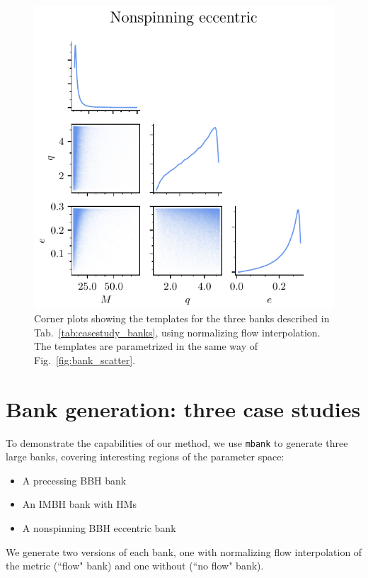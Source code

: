 \documentclass[twocolumn,showpacs,preprintnumbers,nofootinbib,prd,
superscriptaddress,10pt]{revtex4-2}
\begin{document}
\begin{figure}[t]
	\includegraphics[scale = 0.7]{bank_scatter_Nonspinning_eccentric_flow}
	\caption{Corner plots showing the templates for the three banks described in Tab.~\ref{tab:casestudy_banks}, using normalizing flow interpolation. The templates are parametrized in the same way of Fig.~\ref{fig:bank_scatter}.}
	\label{fig:bank_scatter_flow}
\end{figure}

\section{Bank generation: three case studies} \label{sec:bank_generation}

To demonstrate the capabilities of our method, we use \texttt{mbank} to generate three large banks, covering interesting regions of the parameter space:
	\begin{itemize}
		\item A precessing BBH bank
		\item An IMBH bank with HMs
		\item A nonspinning BBH eccentric bank
	\end{itemize}
We generate two versions of each bank, one with normalizing flow interpolation of the metric (``flow" bank) and one without (``no flow" bank).
\end{document}
